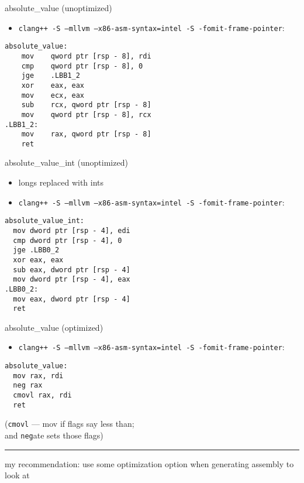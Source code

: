 \begin{frame}[fragile,label=absValueIntelUnopt]{absolute\_value (unoptimized)}
\lstset{
    language=myasm,
    style=smaller,
}
\begin{itemize}
    \item \fontsize{9}{10}\selectfont\texttt{clang++ -S --mllvm --x86-asm-syntax=intel -S -fomit-frame-pointer}:
\end{itemize}
\begin{lstlisting}
absolute_value:
    mov    qword ptr [rsp - 8], rdi
    cmp    qword ptr [rsp - 8], 0
    jge    .LBB1_2
    xor    eax, eax
    mov    ecx, eax
    sub    rcx, qword ptr [rsp - 8]
    mov    qword ptr [rsp - 8], rcx
.LBB1_2:
    mov    rax, qword ptr [rsp - 8]
    ret
\end{lstlisting}
\end{frame}
\begin{frame}[fragile,label=absValueInt]{absolute\_value\_int (unoptimized)}
\lstset{
    language=myasm,
    style=smaller,
}
\begin{itemize}
    \item longs replaced with ints
    \item \fontsize{9}{10}\selectfont\texttt{clang++ -S --mllvm --x86-asm-syntax=intel -S -fomit-frame-pointer}:
\end{itemize}
\begin{lstlisting}
absolute_value_int:
  mov dword ptr [rsp - 4], edi
  cmp dword ptr [rsp - 4], 0
  jge .LBB0_2
  xor eax, eax
  sub eax, dword ptr [rsp - 4]
  mov dword ptr [rsp - 4], eax
.LBB0_2:
  mov eax, dword ptr [rsp - 4]
  ret
\end{lstlisting}
\end{frame}



\begin{frame}[fragile,label=absValueO2]{absolute\_value (optimized)}
\lstset{
    language=myasm,
    morekeywords=cmovl,
}
\begin{itemize}
    \item \fontsize{9}{10}\selectfont \texttt{clang++ -S  --mllvm --x86-asm-syntax=intel -S -fomit-frame-pointer}:
\end{itemize}
\begin{lstlisting}
absolute_value:
  mov rax, rdi
  neg rax
  cmovl rax, rdi    
  ret
\end{lstlisting}
(\texttt{cmovl} --- mov if flags say less than; \\
and \texttt{neg}ate sets those flags)
\hrule
my recommendation: use some optimization option when generating assembly to look at
\end{frame}

